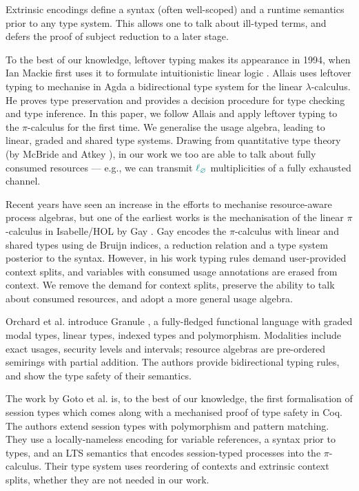 \documentclass[sigplan,10pt,anonymous,review]{acmart}
\theoremstyle{definition}
\newcommand{\lambdacalc}{$\lambda$-calculus}
\newcommand{\picalc}{$\pi$-calculus}
\newcommand{\func}[1]{\textcolor{teal}{\operatorname{#1}}}
\newcommand{\lz}{\func{\ell_{\varnothing}}}
\begin{document}
Extrinsic encodings define a syntax (often well-scoped) and a runtime semantics prior to any type system.
This allows one to talk about ill-typed terms, and defers the proof of subject reduction to a later stage.

To the best of our knowledge, leftover typing makes its appearance in 1994, when Ian Mackie first uses it to formulate intuitionistic linear logic \cite{Mackie}.
Allais \cite{Allais2018a} uses leftover typing to mechanise in Agda a bidirectional type system for the linear \lambdacalc{}.
He proves type preservation and provides a decision procedure for type checking and type inference.
In this paper, we follow Allais \cite{Allais2018a} and apply leftover typing to the \picalc{} for the first time.
We generalise the usage algebra, leading to linear, graded and shared type systems.
Drawing from quantitative type theory (by McBride and Atkey \cite{McBride2016, Atkey2018}), in our work we too are able to talk about fully consumed resources --- e.g., we can transmit $\lz$ multiplicities of a fully exhausted channel.

Recent years have seen an increase in the efforts to mechanise resource-aware process algebras, but one of the earliest works is the mechanisation of the linear \picalc{} in Isabelle/HOL by Gay \cite{Gay2001}.
Gay encodes the \picalc{} with linear and shared types using de Bruijn indices, a reduction relation and a type system posterior to the syntax.
However, in his work typing rules demand user-provided context splits, and variables with consumed usage annotations are erased from context.
We remove the demand for context splits, preserve the ability to talk about consumed resources, and adopt a more general usage algebra.

Orchard et al. introduce Granule \cite{Orchard}, a fully-fledged functional language with graded modal types, linear types, indexed types and polymorphism.
Modalities include exact usages, security levels and intervals; resource algebras are pre-ordered semirings with partial addition.
The authors provide bidirectional typing rules, and show the type safety of their semantics.

The work by Goto et al. \cite{Goto2016a} is, to the best of our knowledge, the first formalisation of session types which comes along with a mechanised proof of type safety in Coq.
The authors extend session types with polymorphism and pattern matching.
They use a locally-nameless encoding for variable references, a syntax prior to types, and an LTS semantics that encodes session-typed processes into the \picalc{}.
Their type system uses reordering of contexts and extrinsic context splits, whether they are not needed in our work. 
\end{document}
